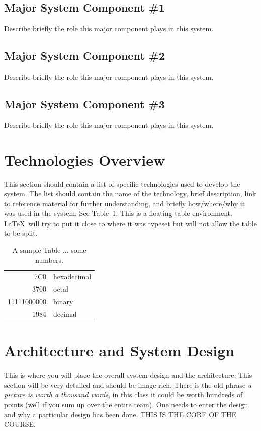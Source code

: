 \subsection{Major System Component \#1}
Describe briefly the role this major component plays in this system. 

\subsection{Major System Component \#2}
Describe briefly the role this major component plays in this system. 

\subsection{Major System Component \#3}
Describe briefly the role this major component plays in this system. 


\section{Technologies Overview}
This section should contain a list of specific technologies used to
develop the system.  The list should contain the name of the
technology, brief description, link to reference material for further
understanding, and briefly how/where/why it was used in the system.
See Table~\ref{somenumbers}.  This is a floating table environment.
\LaTeX\ will try to put it close to where it was typeset but will not
allow the table to be split.

\begin{table}[tbh]
\caption{A sample Table ... some numbers. \label{somenumbers}}
\begin{center}
\begin{tabular}{|r|l|}
  \hline
  7C0 & hexadecimal \\
  3700 & octal \\ \cline{2-2}
  11111000000 & binary \\
  \hline \hline
  1984 & decimal \\
  \hline
\end{tabular}
\end{center}
\end{table}


 \section{Architecture and System Design}
This is where you will place the overall system design and the architecture.   This section will be very detailed and should be image rich.  There is the old phrase {\it a picture is worth a thousand words}, in this class it could be worth hundreds of points (well if you sum up over the entire team).   One needs to enter the design and why a particular design has been done.   THIS IS THE CORE OF THE COURSE.    
 
